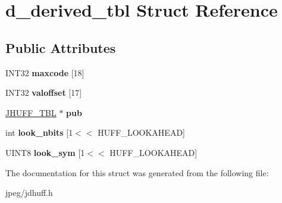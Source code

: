 \hypertarget{structd__derived__tbl}{}\section{d\+\_\+derived\+\_\+tbl Struct Reference}
\label{structd__derived__tbl}
\subsection*{Public Attributes}
\begin{DoxyCompactItemize}
\item 
I\+N\+T32 {\bfseries maxcode} \mbox{[}18\mbox{]}\hypertarget{structd__derived__tbl_a4e226d20d913f1c516bd98a930008ad1}{}\label{structd__derived__tbl_a4e226d20d913f1c516bd98a930008ad1}

\item 
I\+N\+T32 {\bfseries valoffset} \mbox{[}17\mbox{]}\hypertarget{structd__derived__tbl_a67397b3869145321a25d2df17a0c11ec}{}\label{structd__derived__tbl_a67397b3869145321a25d2df17a0c11ec}

\item 
\hyperlink{struct_j_h_u_f_f___t_b_l}{J\+H\+U\+F\+F\+\_\+\+T\+BL} $\ast$ {\bfseries pub}\hypertarget{structd__derived__tbl_a816f4c07d3173cd1a96ef146acabf6c6}{}\label{structd__derived__tbl_a816f4c07d3173cd1a96ef146acabf6c6}

\item 
int {\bfseries look\+\_\+nbits} \mbox{[}1$<$$<$ H\+U\+F\+F\+\_\+\+L\+O\+O\+K\+A\+H\+E\+AD\mbox{]}\hypertarget{structd__derived__tbl_a69e9228ebe44420f896c147bcb8b2f4b}{}\label{structd__derived__tbl_a69e9228ebe44420f896c147bcb8b2f4b}

\item 
U\+I\+N\+T8 {\bfseries look\+\_\+sym} \mbox{[}1$<$$<$ H\+U\+F\+F\+\_\+\+L\+O\+O\+K\+A\+H\+E\+AD\mbox{]}\hypertarget{structd__derived__tbl_a526051256461864bc8395d1f6d1a82fd}{}\label{structd__derived__tbl_a526051256461864bc8395d1f6d1a82fd}

\end{DoxyCompactItemize}


The documentation for this struct was generated from the following file\+:\begin{DoxyCompactItemize}
\item 
jpeg/jdhuff.\+h\end{DoxyCompactItemize}
